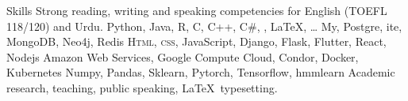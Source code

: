 
\begin{rubric}{Skills}
\entry*[Languages]
	Strong reading, writing and speaking competencies for English (TOEFL 118/120) and Urdu.
	Python, Java, R, C, C++, C\#, , \LaTeX, \ldots
\entry*[Databases]
	My, Postgre,  ite, MongoDB, Neo4j, Redis
	\textsc{Html, css}, JavaScript, Django, Flask, Flutter, React, Nodejs
\entry*[Cloud]
	Amazon Web Services, Google Compute Cloud, Condor, Docker, Kubernetes
	Numpy, Pandas, Sklearn, Pytorch, Tensorflow, hmmlearn
\entry*[Misc.]
	Academic research, teaching, public speaking, \LaTeX\ typesetting.
\end{rubric}
